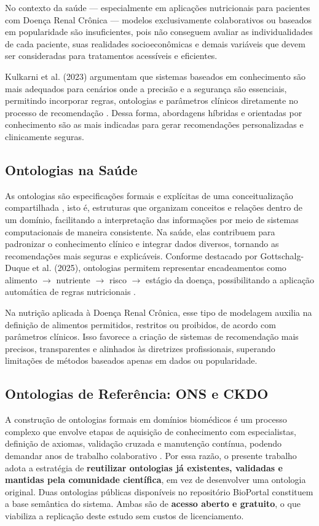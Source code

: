 \documentclass[12pt, a4paper, twocolumn]{article}
\begin{document}
No contexto da saúde --- especialmente em aplicações nutricionais para pacientes com Doença Renal Crônica --- modelos exclusivamente colaborativos ou baseados em popularidade são insuficientes, pois não conseguem avaliar as individualidades de cada paciente, suas realidades socioeconômicas e demais variáveis que devem ser consideradas para tratamentos acessíveis e eficientes.

Kulkarni et al. (2023) argumentam que sistemas baseados em conhecimento são mais adequados para cenários onde a precisão e a segurança são essenciais, permitindo incorporar regras, ontologias e parâmetros clínicos diretamente no processo de recomendação \cite{kulkarni}. Dessa forma, abordagens híbridas e orientadas por conhecimento são as mais indicadas para gerar recomendações personalizadas e clinicamente seguras.

    \subsection{Ontologias na Saúde}

As ontologias são especificações formais e explícitas de uma conceitualização compartilhada \cite{gruber1993}, isto é, estruturas que organizam conceitos e relações dentro de um domínio, facilitando a interpretação das informações por meio de sistemas computacionais de maneira consistente. Na saúde, elas contribuem para padronizar o conhecimento clínico e integrar dados diversos, tornando as recomendações mais seguras e explicáveis. Conforme destacado por Gottschalg-Duque et al. (2025), ontologias permitem representar encadeamentos como alimento $\rightarrow$ nutriente $\rightarrow$ risco $\rightarrow$ estágio da doença, possibilitando a aplicação automática de regras nutricionais \cite{gottschalg2025}.

Na nutrição aplicada à Doença Renal Crônica, esse tipo de modelagem auxilia na definição de alimentos permitidos, restritos ou proibidos, de acordo com parâmetros clínicos. Isso favorece a criação de sistemas de recomendação mais precisos, transparentes e alinhados às diretrizes profissionais, superando limitações de métodos baseados apenas em dados ou popularidade.

    \subsection{Ontologias de Referência: ONS e CKDO}

A construção de ontologias formais em domínios biomédicos é um processo complexo que envolve etapas de aquisição de conhecimento com especialistas, definição de axiomas, validação cruzada e manutenção contínua, podendo demandar anos de trabalho colaborativo \cite{gruber1993}. Por essa razão, o presente trabalho adota a estratégia de \textbf{reutilizar ontologias já existentes, validadas e mantidas pela comunidade científica}, em vez de desenvolver uma ontologia original. Duas ontologias públicas disponíveis no repositório BioPortal constituem a base semântica do sistema. Ambas são de \textbf{acesso aberto e gratuito}, o que viabiliza a replicação deste estudo sem custos de licenciamento.
\end{document}
